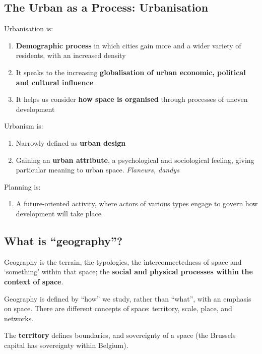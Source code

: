 \documentclass{article}
\begin{document}
\subsection{The Urban as a Process: Urbanisation}

Urbanisation is:

\begin{enumerate}
  \item \textbf{Demographic process} in which cities gain more and a wider variety of residents, with an increased density
  \item It speaks to the increasing \textbf{globalisation of urban economic, political and cultural influence}
  \item It helps us consider \textbf{how space is organised} through processes of uneven development
\end{enumerate}

Urbanism is:

\begin{enumerate}
  \item Narrowly defined as \textbf{urban design}
  \item Gaining an \textbf{urban attribute}, a psychological and sociological feeling, giving particular meaning to urban space. \textit{Flaneurs, dandys}
\end{enumerate}

Planning is:

\begin{enumerate}
  \item A future-oriented activity, where actors of various types engage to govern how development will take place
\end{enumerate}

\subsection{What is ``geography''?}

Geography is the terrain, the typologies, the interconnectedness of space and `something' within that space; the \textbf{social and physical processes within the context of space}.

Geography is defined by ``how'' we study, rather than ``what'', with an emphasis on space. There are different concepts of space: territory, scale, place, and networks.

The \textbf{territory} defines boundaries, and sovereignty of a space (the Brussels capital has sovereignty within Belgium). 
\end{document}
